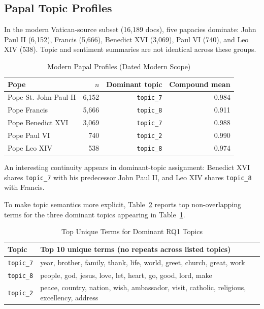 \documentclass[conference]{IEEEtran}
\begin{document}
\subsection{Papal Topic Profiles}
In the modern Vatican-source subset (16,189 docs), five papacies dominate: John Paul II (6,152), Francis (5,666), Benedict XVI (3,069), Paul VI (740), and Leo XIV (538). Topic and sentiment summaries are not identical across these groups.

\begin{table}[htbp]
\caption{Modern Papal Profiles (Dated Modern Scope)}
\label{tab:rq1_popes}
\centering
\begin{tabular}{lrrr}
\toprule
Pope & $n$ & Dominant topic & Compound mean \\
\midrule
Pope St. John Paul II & 6,152 & \texttt{topic\_7} & 0.984 \\
Pope Francis & 5,666 & \texttt{topic\_8} & 0.911 \\
Pope Benedict XVI & 3,069 & \texttt{topic\_7} & 0.988 \\
Pope Paul VI & 740 & \texttt{topic\_2} & 0.990 \\
Pope Leo XIV & 538 & \texttt{topic\_8} & 0.974 \\
\bottomrule
\end{tabular}
\end{table}

An interesting continuity appears in dominant-topic assignment: Benedict XVI shares \texttt{topic\_7} with his predecessor John Paul II, and Leo XIV shares \texttt{topic\_8} with Francis.

To make topic semantics more explicit, Table~\ref{tab:rq1_topic_terms} reports top non-overlapping terms for the three dominant topics appearing in Table~\ref{tab:rq1_popes}.

\begin{table}[htbp]
\caption{Top Unique Terms for Dominant RQ1 Topics}
\label{tab:rq1_topic_terms}
\centering
\footnotesize
\begin{tabular}{lp{}}
\toprule
Topic & Top 10 unique terms (no repeats across listed topics) \\
\midrule
\texttt{topic\_7} & year, brother, family, thank, life, world, greet, church, great, work \\
\texttt{topic\_8} & people, god, jesus, love, let, heart, go, good, lord, make \\
\texttt{topic\_2} & peace, country, nation, wish, ambassador, visit, catholic, religious, excellency, address \\
\bottomrule
\end{tabular}
\end{table}
\end{document}
